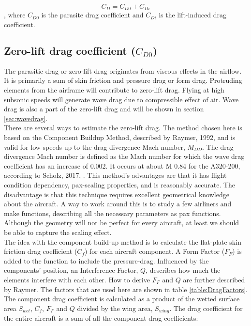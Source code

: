 \documentclass[english]{kththesis}
\begin{document}
\begin{equation}
\label{eq:CD}
C_D = C_{D0} + C_{Di}%
\end{equation}
, where $C_{D0}$ is the parasite drag coefficient and $C_{Di}$ is the lift-induced drag coefficient.

\subsection{Zero-lift drag coefficient ($C_{D0}$)}
\label{sec:CD0}
The parasitic drag or zero-lift drag originates from viscous effects in the airflow. It is primarily a sum of skin friction and pressure drag or form drag. Protruding elements from the airframe will contribute to zero-lift drag. Flying at high subsonic speeds will generate wave drag due to compressible effect of air. Wave drag is also a part of the zero-lift drag and will be shown in section \ref{sec:wavedrag}.\\

There are several ways to estimate the zero-lift drag. The method chosen here is based on the Component Buildup Method, described by Raymer, 1992, \cite{Raymer1992} and is valid for low speeds up to the drag-divergence Mach number, $M_{DD}$. The drag-divergence Mach number is defined as the Mach number for which the wave drag coefficient has an increase of 0.002. It occurs at about M 0.84 for the A320-200, according to Scholz, 2017, \cite{Scholz2017}. This method's advantages are that it has flight condition dependency, pax-scaling properties, and is reasonably accurate. The disadvantage is that this technique requires excellent geometrical knowledge about the aircraft. A way to work around this is to study a few airliners and make functions, describing all the necessary parameters as pax functions. Although the geometry will not be perfect for every aircraft, at least we should be able to capture the scaling effect.\\

The idea with the component build-up method is to calculate the flat-plate skin friction drag coefficient ($C_f$) for each aircraft component. A Form Factor ($F_F$) is added to the function to include the pressure-drag. Influenced by the components' position, an Interference Factor, $Q$, describes how much the elements interfere with each other. How to derive $F_F$ and $Q$ are further described by Raymer. The factors that are used here are shown in table \ref{table:DragFactors}. The component drag coefficient is calculated as a product of the wetted surface area $S_{wet}$, $C_f$, $F_F$ and $Q$ divided by the wing area, $S_{wing}$. The drag coefficient for the entire aircraft is a sum of all the component drag coefficients:
\end{document}
